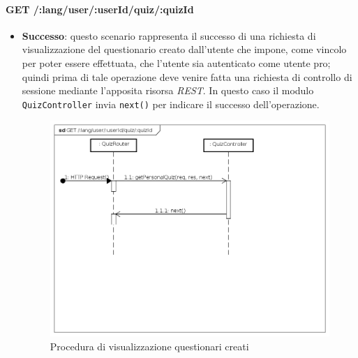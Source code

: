 \paragraph{GET /:lang/user/:userId/quiz/:quizId} %
\begin{itemize}
\item \textbf{Successo}: questo scenario rappresenta il successo di una richiesta di visualizzazione del questionario creato dall'utente che impone, come vincolo per poter essere effettuata, che l'utente sia autenticato come utente pro; quindi prima di tale operazione deve venire fatta una richiesta di controllo di sessione mediante l'apposita risorsa \textit{REST}. In questo caso il modulo \texttt{QuizController} invia \texttt{next()} per indicare il successo dell'operazione.
\label{Procedura di visualizzazione questionario creato}
\begin{figure}[ht]
	\centering
	\includegraphics[scale=0.40]{UML/DiagrammiDiSequenza/Back-end/GET__lang_user_userId_quiz_quizId_success.png}
	\caption{Procedura di visualizzazione questionari creati}
\end{figure}
\FloatBarrier


\end{itemize}

